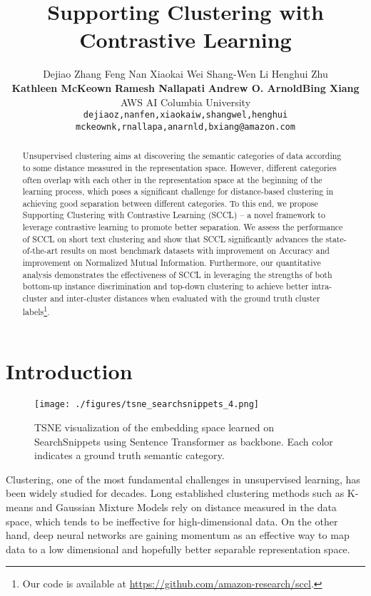 \documentclass[11pt]{article}
\title{Supporting Clustering with Contrastive Learning}
\author{Dejiao Zhang \quad Feng Nan \quad Xiaokai Wei \quad Shang-Wen Li  \quad  Henghui Zhu \\ \quad   \quad \textbf{Kathleen McKeown} \quad
\textbf{Ramesh Nallapati} \quad 
\textbf{Andrew O. Arnold}\quad \textbf{Bing Xiang} \\
AWS AI \qquad  Columbia University\\
  \texttt{dejiaoz,nanfen,xiaokaiw,shangwel,henghui} \\
  \texttt{mckeownk,rnallapa,anarnld,bxiang@amazon.com}
  }
\begin{document}
\maketitle


\begin{abstract}
Unsupervised clustering aims at discovering the semantic categories of data according to some distance measured in the representation space. However, different categories often overlap with each other in the representation space at the beginning of the learning process, which poses a significant challenge for distance-based clustering in achieving good separation between different categories. To this end, we propose Supporting Clustering with Contrastive Learning (SCCL) -- a novel framework to leverage contrastive learning to promote better separation. We assess the performance of SCCL on short text clustering and show that SCCL significantly advances the state-of-the-art results on most 
benchmark datasets with  improvement on Accuracy and  improvement on Normalized Mutual Information. Furthermore, our quantitative analysis demonstrates the effectiveness of SCCL in leveraging the strengths of both bottom-up instance discrimination and  top-down clustering
to achieve better intra-cluster and inter-cluster distances when evaluated with the ground truth cluster labels\footnote{Our code is available at  \url{https://github.com/amazon-research/sccl}.}.
\end{abstract}


\section{Introduction}
\begin{figure}[htbp]
    \centering
    \texttt{[image: ./figures/tsne\_searchsnippets\_4.png]}
    \caption{TSNE visualization of the embedding space learned on SearchSnippets using Sentence Transformer \citep{reimers-2019-sentence-bert} as backbone. Each color indicates a ground truth semantic category.
}
    \label{fig:tsne_illustration}
\end{figure}
Clustering, one of the most fundamental challenges in unsupervised learning, has been widely studied for decades. 
Long established clustering methods
such as K-means \citep{macqueen1967some, lloyd1982least} and Gaussian Mixture Models \citep{celeux1995gaussian} rely on distance measured in the data space, which tends to be ineffective for high-dimensional data. 
On the other hand, deep neural networks are gaining momentum as an effective way to map data to a low dimensional and hopefully better separable representation space.
\end{document}
